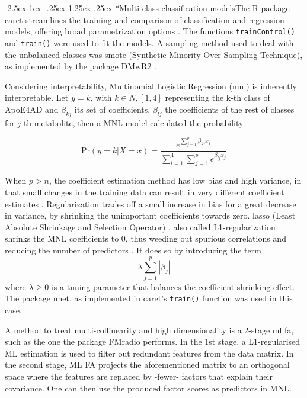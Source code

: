 \documentclass{amsart}
\makeatletter
\renewcommand\paragraph{\@startsection{paragraph}{4}{\z@}%
            {-2.5ex\@plus -1ex \@minus -.25ex}%
            {1.25ex \@plus .25ex}%
            {\normalfont\normalsize\bfseries}}
\makeatother
\begin{document}
\paragraph*{Multi-class classification models}The R package \textsf{caret} streamlines the training and comparison of classification and regression models, offering broad parametrization options \cite{Kuhn2008BuildingPackage}. The functions \texttt{trainControl()} and \texttt{train()} were used to fit the models. A sampling method used to deal with the unbalanced classes was \acrshort{smote} (Synthetic Minority Over-Sampling Technique), as implemented by the package \textsf{DMwR2} \cite{DMwR2}.

Considering interpretability, Multinomial Logistic Regression (\acrshort{mnl}) is inherently interpretable. Let $y = k$, with $k \in N, [1,4]$ representing the k-th class of ApoE4AD and $\beta_{kj}$ its set of coefficients,  $\beta_{lj}$ the coefficients of the rest of classes for $j$-th metabolite, then a MNL model calculated the probability

\[\textrm{Pr}(y=k|X=x) =  \dfrac{e^{\sum_{j=1}^{p}\beta_{kj}x_j}}{\sum_{l=1}^{4}\sum_{j=1}^{p}e^{\beta_{lj}x_j}}\]

When $p > n$, the coefficient estimation method has low bias and high variance, in that small changes in the training data can result in very different coefficient estimates \cite{James2023AnEdition}. Regularization trades off a small increase in bias for a great decrease in variance, by shrinking the unimportant coefficients towards zero. \acrshort{lasso} (Least Absolute Shrinkage and Selection Operator) \cite{Tibshiranit1996RegressionLasso}, also called L1-regularization shrinks the MNL coefficients to 0, thus weeding out spurious correlations and reducing the number of predictors \cite{Tibshiranit1996RegressionLasso}. It does so by introducing the term  \[\lambda\sum_{j=1}^{p}|\beta_j|\] where $\lambda \geq 0$ is a tuning parameter that balances the coefficient shrinking effect. The package \textsf{nnet}, as implemented in \textsf{caret}'s \texttt{train()} function was used in this case.

A method to treat multi-collinearity and high dimensionality is a 2-stage \acrfull{ml} \acrfull{fa}, such as the one the package \textsf{FMradio} \cite{Peeters2019StableData} performs. In the 1st stage, a L1-regularised ML estimation is used to filter out redundant features from the data matrix. In the second stage, ML FA projects the aforementioned matrix to an orthogonal space where the features are replaced by -fewer- factors that explain their covariance. One can then use the produced factor scores as predictors in MNL.
\end{document}
